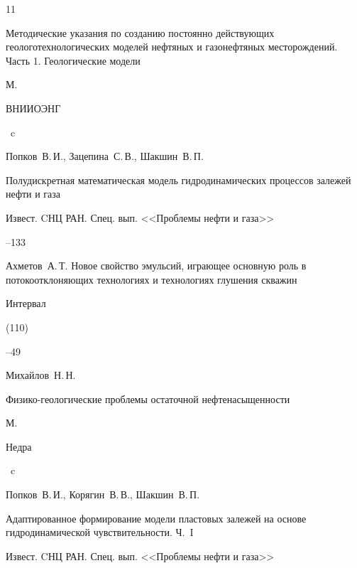 \begin{thebibliography}{11}


\book Методические указания по созданию постоянно действующих геологотехнологических моделей нефтяных и газонефтяных месторождений. Часть 1. Геологические модели

\publaddr  М.

\publ ВНИИОЭНГ


~c




\by Попков~В.\,И., Зацепина~С.\,В., Шакшин~В.\,П.

\paper Полудискретная математическая модель гидродинамических процессов залежей нефти и газа

\jour Извест. CНЦ РАН. Спец. вып. <<Проблемы нефти и газа>>


--133






\by Ахметов~А.\,Т. Новое свойство эмульсий, играющее основную роль в потокоотклоняющих технологиях и технологиях глушения скважин

\jour Интервал

(110)


--49




\by Михайлов~Н.\,Н.

\book  Физико-геологические проблемы остаточной нефтенасыщенности

\publaddr М.

\publ Недра


~c






\by Попков~В.\,И., Корягин~В.\,В., Шакшин~В.\,П.

\paper Адаптированное формирование модели пластовых залежей на основе гидродинамической чувствительности. Ч.~I

\jour Извест. CНЦ РАН. Спец. вып. <<Проблемы нефти и газа>>


\end{thebibliography}
